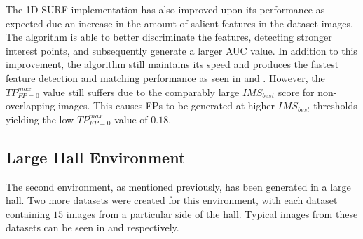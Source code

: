 \documentclass[11pt]{report}
\begin{document}
The 1D SURF implementation has also improved upon its performance as expected due an increase in the amount of salient features in the dataset images. The algorithm is able to better discriminate the features, detecting stronger interest points, and subsequently generate a larger AUC value. In addition to this improvement, the algorithm still maintains its speed and produces the fastest feature detection and matching performance as seen in  and . However, the $TP_{FP=0}^{max}$ value still suffers due to the comparably large $IMS_{best}$ score for non-overlapping images. This causes FPs to be generated at higher $IMS_{best}$ thresholds yielding the low $TP_{FP=0}^{max}$ value of $0.18$. \\


\subsection{Large Hall Environment}
\label{sec:largeHall}
The second environment, as mentioned previously, has been generated in a large hall. Two more datasets were created for this environment, with each dataset containing $15$ images from a particular side of the hall. Typical images from these datasets can be seen in  and  respectively.\\ 
\end{document}
